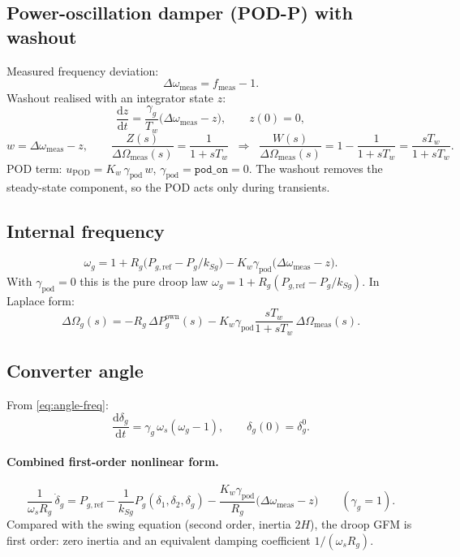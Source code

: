 \documentclass[11pt,a4paper]{article}
\numberwithin{equation}{section}
\newcommand{\dd}{\mathrm{d}}
\begin{document}
\subsection{Power-oscillation damper (POD-P) with washout}
Measured frequency deviation:
\begin{equation}
\Delta\omega_{\text{meas}} = f_{\text{meas}} - 1 .
\end{equation}
Washout realised with an integrator state $z$:
\begin{equation}
\boxed{\frac{\dd z}{\dd t} = \frac{\gamma_g}{T_w}\big(\Delta\omega_{\text{meas}} - z\big),\qquad z(0)=0,}
\end{equation}
\begin{equation}
w = \Delta\omega_{\text{meas}} - z,\qquad
\frac{Z(s)}{\Delta\Omega_{\text{meas}}(s)} = \frac{1}{1+sT_w}
\;\;\Longrightarrow\;\;
\frac{W(s)}{\Delta\Omega_{\text{meas}}(s)} = 1-\frac{1}{1+sT_w} = \frac{sT_w}{1+sT_w}.
\end{equation}
POD term: $u_{\text{POD}} = K_w\,\gamma_{\text{pod}}\,w$, $\gamma_{\text{pod}} = \texttt{pod\_on} = 0$. The washout removes the steady-state component, so the POD acts only during transients.

\subsection{Internal frequency}
\begin{equation}
\boxed{\omega_g = 1 + R_g\big(P_{g,\text{ref}} - P_g/k_{Sg}\big) - K_w\gamma_{\text{pod}}\big(\Delta\omega_{\text{meas}} - z\big).}
\end{equation}
With $\gamma_{\text{pod}}=0$ this is the pure droop law $\omega_g = 1 + R_g(P_{g,\text{ref}} - P_g/k_{Sg})$. In Laplace form:
\begin{equation}
\Delta\Omega_g(s) = -R_g\,\Delta P_g^{\text{own}}(s) - K_w\gamma_{\text{pod}}\frac{sT_w}{1+sT_w}\,\Delta\Omega_{\text{meas}}(s).
\end{equation}

\subsection{Converter angle}
From \eqref{eq:angle-freq}:
\begin{equation}
\boxed{\frac{\dd\delta_g}{\dd t} = \gamma_g\,\omega_s(\omega_g - 1),\qquad \delta_g(0) = \delta_g^0.}
\end{equation}
\paragraph{Combined first-order nonlinear form.}
\begin{equation}
\frac{1}{\omega_s R_g}\,\dot\delta_g
= P_{g,\text{ref}} - \frac{1}{k_{Sg}}P_g(\delta_1,\delta_2,\delta_g) - \frac{K_w\gamma_{\text{pod}}}{R_g}\big(\Delta\omega_{\text{meas}}-z\big)\qquad(\gamma_g=1).
\end{equation}
Compared with the swing equation (second order, inertia $2H$), the droop GFM is first order: zero inertia and an equivalent damping coefficient $1/(\omega_sR_g)$.
\end{document}
